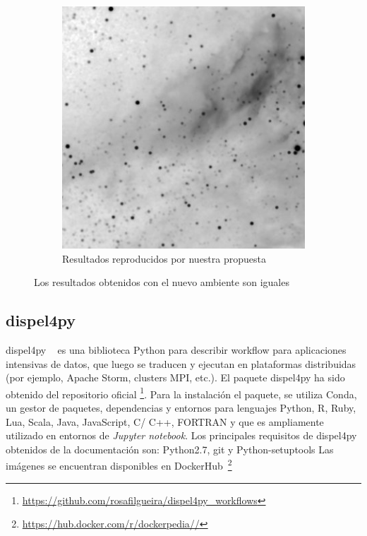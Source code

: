\begin{figure}[t]
\begin{subfigure}[b]{0.4\textwidth}
         \includegraphics[width=\textwidth]{Figures/montage-mosorio}
         \caption[Resultados workflow reproducidos: Montage]{Resultados reproducidos por nuestra propuesta}
         \label{fig:montage-mosorio}
     \end{subfigure}
        \caption[Comparación resultados Montage]{Los resultados obtenidos con el nuevo ambiente son iguales}
        \label{fig:montage-results}
\end{figure}



\subsection{dispel4py}

dispel4py ~\cite{DBLP:conf/eScience/FilgueiraKAKSS15} es una biblioteca Python para describir workflow para aplicaciones intensivas de datos, que luego se traducen y ejecutan en plataformas distribuidas (por ejemplo, Apache Storm, clusters MPI, etc.).
El paquete dispel4py ha sido obtenido del repositorio oficial \footnote{\url{https://github.com/rosafilgueira/dispel4py_workflows}}. 
Para la instalación el paquete, se utiliza Conda, un gestor de paquetes, dependencias y entornos para lenguajes Python, R, Ruby, Lua, Scala, Java, JavaScript, C/ C++, FORTRAN y que es ampliamente utilizado en entornos de \textit{Jupyter notebook}. 
Los principales requisitos de dispel4py obtenidos de la documentación son: Python2.7, git y  Python-setuptools
Las imágenes se encuentran disponibles en DockerHub~\footnote{\url{https://hub.docker.com/r/dockerpedia//}}



